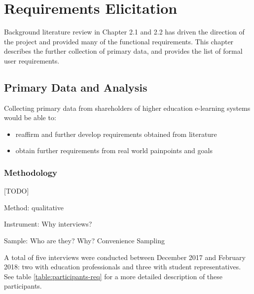 \chapter{Requirements Elicitation}

Background literature review in Chapter 2.1 and 2.2 has driven the direction of the project and 
provided many of the functional requirements. This chapter describes the further collection of primary 
data, and provides the list of formal user requirements.

\section{Primary Data and Analysis}
Collecting primary data from shareholders of higher education e-learning systems would be able to:
\begin{itemize}
    \item reaffirm and further develop requirements obtained from literature
    \item obtain further requirements from real world painpoints and goals
\end{itemize}

\subsection{Methodology}

[TODO]

Method: qualitative

Instrument: Why interviews?

Sample: Who are they? Why? Convenience Sampling

A total of five interviews were conducted between December 2017 and February 2018: 
two with education professionals and three with student representatives. See table 
\ref{table:participants-req} for a more detailed description of these participants.

